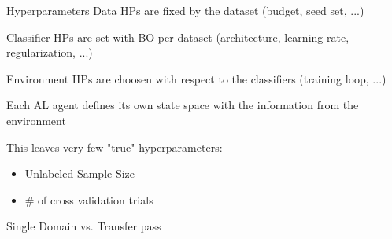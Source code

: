 \documentclass[aspectratio=169, 11pt, invertlogo]{ismll-slides}
\begin{document}

\begin{frame}[fragile]{Hyperparameters}
	Data HPs are fixed by the dataset (budget, seed set, ...)
	
	Classifier HPs are set with BO per dataset (architecture, learning rate, regularization, ...)
	
	Environment HPs are choosen with respect to the classifiers (training loop, ...)
	
	Each AL agent defines its own state space with the information from the environment
	
	This leaves very few "true" hyperparameters: 
	\begin{itemize}
		\item Unlabeled Sample Size
		\item \# of cross validation trials
	\end{itemize}
\end{frame}


\begin{frame}[fragile]{Single Domain vs. Transfer}
	pass
\end{frame}
\end{document}
